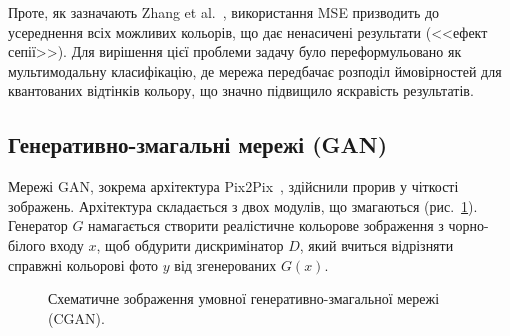 \documentclass[]{iptconf}
\begin{document}
            Проте, як зазначають Zhang et al.~\cite{2016-colorful-image-colorization}, використання MSE призводить до усереднення всіх можливих кольорів, що дає ненасичені результати (<<ефект сепії>>). Для вирішення цієї проблеми задачу було переформульовано як мультимодальну класифікацію, де мережа передбачає розподіл ймовірностей для квантованих відтінків кольору, що значно підвищило яскравість результатів.

        \subsection{Генеративно-змагальні мережі (GAN)}

            Мережі GAN, зокрема архітектура Pix2Pix~\cite{2017-image-to-image-translation}, здійснили прорив у чіткості зображень. Архітектура складається з двох модулів, що змагаються (рис.~\ref{fig:gan}). Генератор $G$ намагається створити реалістичне кольорове зображення з чорно-білого входу $x$, щоб обдурити дискримінатор $D$, який вчиться відрізняти справжні кольорові фото $y$ від згенерованих $G(x)$.
            
            \begin{figure}[h]
                \centering
                \caption{Схематичне зображення умовної генеративно-змагальної мережі (CGAN).}
                \label{fig:gan}
            \end{figure}
\end{document}
